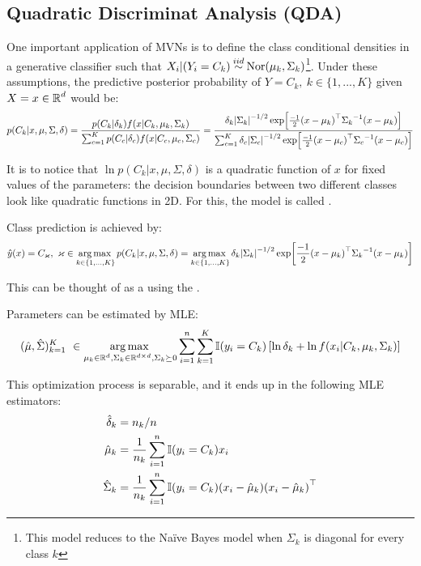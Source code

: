 \subsection{Quadratic Discriminat Analysis (QDA)}
One important application of MVNs is to define the class conditional densities in a generative classifier such that $X_i|(Y_i=C_k)\dist{iid}\text{Nor}(\mu_k,\Sigma_k)$\footnote{This model reduces to the Naïve Bayes model when $\Sigma_k$ is diagonal for every class $k$}. Under these assumptions, the predictive posterior probability of $Y=C_k,\ k\in\{1,...,K\}$ given $X=x\in\operatorname{\mathbb{R}}^d$ would be:
\begin{equation*}
    p(C_k|x,\mu,\Sigma,\delta) = \frac{p(C_k|\delta_k)f(x|C_k,\mu_k,\Sigma_k)}{\sum_{c=1}^K p(C_c|\delta_c)f(x|C_c,\mu_c,\Sigma_c)} = \frac{\delta_k\abs{\Sigma_k}^{-1/2} \exp[\frac{-1}{2}{(x-\mu_k)}^\top{\Sigma_k}^{-1}(x-\mu_k)]}{\sum_{c=1}^K \delta_c\abs{\Sigma_c}^{-1/2} \exp[\frac{-1}{2}{(x-\mu_c)}^\top{\Sigma_c}^{-1}(x-\mu_c)]}
\end{equation*}

It is to notice that $\ln p(C_k|x,\mu,\Sigma,\delta)$ is a quadratic function of $x$ for fixed values of the parameters: the decision boundaries between two different classes look like quadratic functions in 2D. For this, the model is called .

Class prediction is achieved by:
\begin{equation*}
    \hat{y}(x) = C_{\varkappa},\ \varkappa \in \operatorname*{arg\,max\,}_{k\in \{1,\dots,K\}} p(C_k|x,\mu,\Sigma,\delta) = \operatorname*{arg\,max\,}_{k\in \{1,\dots,K\}} \delta_k\abs{\Sigma_k}^{-1/2} \exp[\frac{-1}{2}{(x-\mu_k)}^\top{\Sigma_k}^{-1}(x-\mu_k)]
\end{equation*}

This can be thought of as a  using the .

Parameters can be estimated by MLE:
\begin{equation*}
    (\hat{\mu},\hat{\Sigma})_{k=1}^K\ \in \operatorname*{arg\,max\,}_{\mu_k\in\operatorname{\mathbb{R}}^d, \Sigma_k\in \operatorname{\mathbb{R}}^{d\times d}, \Sigma_k\succeq 0} \sum_{i=1}^n\sum_{k=1}^K\operatorname{\mathbb{I}}(y_i=C_k)\left[\ln\delta_k + \ln f(x_i|C_k, \mu_k, \Sigma_k)\right]
\end{equation*}

This optimization process is separable, and it ends up in the following MLE estimators:
\begin{align*}
    \hat{\delta}_k &= n_k/n\\
    \hat{\mu}_k &= \dfrac{1}{n_k}\sum_{i=1}^n \operatorname{\mathbb{I}}(y_i=C_k)x_i\\
    \hat{\Sigma}_k &= \dfrac{1}{n_k}\sum_{i=1}^n \operatorname{\mathbb{I}}(y_i=C_k) (x_i-\hat{\mu}_k){(x_i-\hat{\mu}_k)}^\top
\end{align*}



